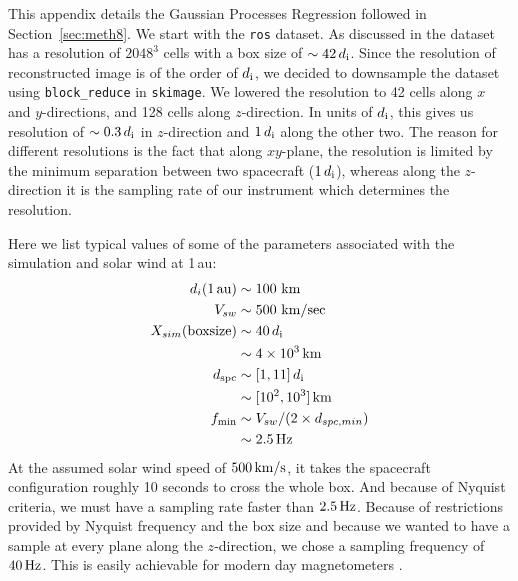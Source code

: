 %
%
 \label{apdx:C}

    This appendix details the Gaussian Processes Regression followed in Section~\ref{sec:meth8}. We
    start with the \texttt{ros} dataset. As discussed in  the dataset has a
    resolution of $2048^3$ cells with a box size of $\sim 42\,d_{\rm i}$. Since the resolution of
    reconstructed image is of the order of $d_{\rm i}$, we decided to downsample the dataset using
    \texttt{block\_reduce} in \texttt{skimage}. We lowered the resolution to 42 cells along $x$ and
    $y$-directions, and 128 cells along $z$-direction. In units of $d_{\rm i}$, this gives us
    resolution of $\sim 0.3\,d_{\rm i}$ in $z$-direction and $1\,d_{\rm i}$ along the other two. The
    reason for different resolutions is the fact that along $xy$-plane, the resolution is limited by
    the minimum separation between two spacecraft ($1\,d_{\rm i}$), whereas along the $z$-direction
    it is the sampling rate of our instrument which determines the resolution.
    
    Here we list typical values of some of the parameters associated with the simulation and solar
    wind at 1\,au:
    \begin{align*}
        d_i \rm{(1\,au)} & \sim 100 ~\rm{km} \\
        V_{sw} & \sim 500 ~\rm{km/sec} \\
        X_{sim} \rm{(box size)} & \sim 40\,d_{\rm i} \\
        & \sim 4\times 10^3\,\rm{km} \\
        d_{\rm spc} & \sim [1, 11]\,d_{\rm i} \\
        & \sim \rm{ [10^2, 10^3]\,km} \\
        f_{\rm min} & \sim V_{sw}/(2\times d_{spc, min}) \\
        & \sim 2.5\,\rm{Hz} \\
    \end{align*}
    At the assumed solar wind speed of $500\,\rm{km/s}$, it takes the spacecraft configuration
    roughly 10 seconds to cross the whole box. And because of Nyquist criteria, we must have a
    sampling rate faster than $2.5\,\rm{Hz}$. Because of restrictions provided by Nyquist frequency
    and the box size and because we wanted to have a sample at every plane along the $z$-direction,
    we chose a sampling frequency of $40\,\rm{Hz}$. This is easily achievable for modern day
    magnetometers \citep{Bale2016, Russell2016}.

